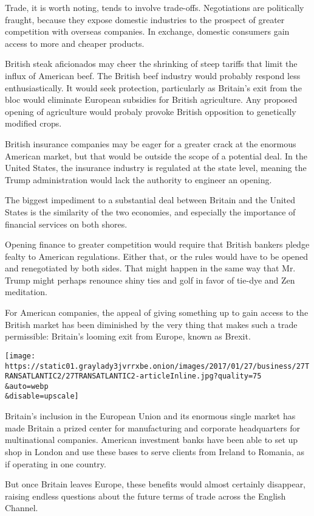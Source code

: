 Trade, it is worth noting, tends to involve trade-offs. Negotiations are
politically fraught, because they expose domestic industries to the
prospect of greater competition with overseas companies. In exchange,
domestic consumers gain access to more and cheaper products.

British steak aficionados may cheer the shrinking of steep tariffs that
limit the influx of American beef. The British beef industry would
probably respond less enthusiastically. It would seek protection,
particularly as Britain's exit from the bloc would eliminate European
subsidies for British agriculture. Any proposed opening of agriculture
would probaly provoke British opposition to genetically modified crops.

British insurance companies may be eager for a greater crack at the
enormous American market, but that would be outside the scope of a
potential deal. In the United States, the insurance industry is
regulated at the state level, meaning the Trump administration would
lack the authority to engineer an opening.

The biggest impediment to a substantial deal between Britain and the
United States is the similarity of the two economies, and especially the
importance of financial services on both shores.

Opening finance to greater competition would require that British
bankers pledge fealty to American regulations. Either that, or the rules
would have to be opened and renegotiated by both sides. That might
happen in the same way that Mr. Trump might perhaps renounce shiny ties
and golf in favor of tie-dye and Zen meditation.

For American companies, the appeal of giving something up to gain access
to the British market has been diminished by the very thing that makes
such a trade permissible: Britain's looming exit from Europe, known as
Brexit.

\texttt{[image: https://static01.graylady3jvrrxbe.onion/images/2017/01/27/business/27TRANSATLANTIC2/27TRANSATLANTIC2-articleInline.jpg?quality=75\\\&auto=webp\\\&disable=upscale]}

Britain's inclusion in the European Union and its enormous single market
has made Britain a prized center for manufacturing and corporate
headquarters for multinational companies. American investment banks have
been able to set up shop in London and use these bases to serve clients
from Ireland to Romania, as if operating in one country.

But once Britain leaves Europe, these benefits would almost certainly
disappear, raising endless questions about the future terms of trade
across the English Channel.

